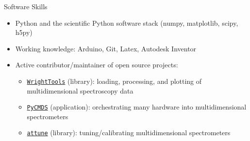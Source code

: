 \documentclass{resume} %
\begin{document}
\begin{rSection}{Software Skills}
	\begin{itemize}[leftmargin = 0 pt]
		\item Python and the scientific Python software stack (numpy, matplotlib, scipy, h5py)
		\item Working knowledge: Arduino, Git, Latex, Autodesk Inventor
		\item Active contributor/maintainer of open source projects:
		\begin{itemize}
			\item \href{http://wright.tools}{\texttt{WrightTools}} (library): loading, processing, and plotting of multidimensional spectroscopy data 
			\item \href{http://github.com/wright-group/PyCMDS}{\texttt{PyCMDS}} (application): orchestrating many hardware into multidimensional spectrometers  
			\item \href{http://github.com/wright-group/attune}{\texttt{attune}} (library): tuning/calibrating multidimensional spectrometers
		\end{itemize}
		
	\end{itemize}	
\end{rSection}

\pagebreak
\end{document}
